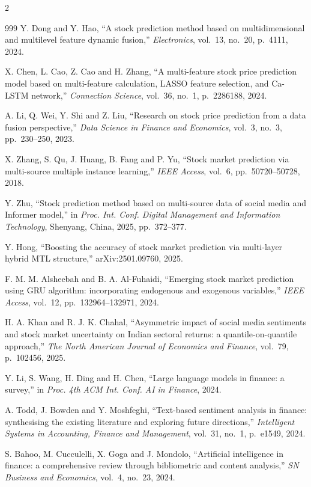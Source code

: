 \begin{footnotesize}
\begin{multicols}{2}
\begin{thebibliography}{999}
 Y. Dong and Y. Hao, ``A stock prediction method based on multidimensional
and multilevel feature dynamic fusion,'' \emph{Electronics}, vol.~13, no.~20, p.~4111, 2024.

 X. Chen, L. Cao, Z. Cao and H. Zhang, ``A multi-feature stock price
prediction model based on multi-feature calculation, LASSO feature selection, and Ca-LSTM
network,'' \emph{Connection Science}, vol.~36, no.~1, p.~2286188, 2024.

 A. Li, Q. Wei, Y. Shi and Z. Liu, ``Research on stock price
prediction from a data fusion perspective,'' \emph{Data Science in Finance and Economics},
vol.~3, no.~3, pp.~230--250, 2023.

 X. Zhang, S. Qu, J. Huang, B. Fang and P. Yu, ``Stock market
prediction via multi-source multiple instance learning,'' \emph{IEEE Access}, vol.~6,
pp.~50720--50728, 2018.

 Y. Zhu, ``Stock prediction method based on multi-source data of
social media and Informer model,'' in \emph{Proc. Int. Conf. Digital Management and
Information Technology}, Shenyang, China, 2025, pp.~372--377.

 Y. Hong, ``Boosting the accuracy of stock market prediction via
multi-layer hybrid MTL structure,'' arXiv:2501.09760, 2025.

 F. M. M. Alsheebah and B. A. Al-Fuhaidi, ``Emerging stock market
prediction using GRU algorithm: incorporating endogenous and exogenous variables,''
\emph{IEEE Access}, vol.~12, pp.~132964--132971, 2024.

 H. A. Khan and R. J. K. Chahal, ``Asymmetric impact of social
media sentiments and stock market uncertainty on Indian sectoral returns: a
quantile-on-quantile approach,'' \emph{The North American Journal of Economics and Finance},
vol.~79, p.~102456, 2025.

 Y. Li, S. Wang, H. Ding and H. Chen, ``Large language models in
finance: a survey,'' in \emph{Proc. 4th ACM Int. Conf. AI in Finance}, 2024.

 A. Todd, J. Bowden and Y. Moshfeghi, ``Text-based sentiment analysis in
finance: synthesising the existing literature and exploring future directions,''
\emph{Intelligent Systems in Accounting, Finance and Management}, vol.~31, no.~1, p.~e1549,
2024.

 S. Bahoo, M. Cucculelli, X. Goga and J. Mondolo, ``Artificial intelligence
in finance: a comprehensive review through bibliometric and content analysis,'' \emph{SN
Business and Economics}, vol.~4, no.~23, 2024.


\end{thebibliography}
\end{multicols}
\end{footnotesize}
